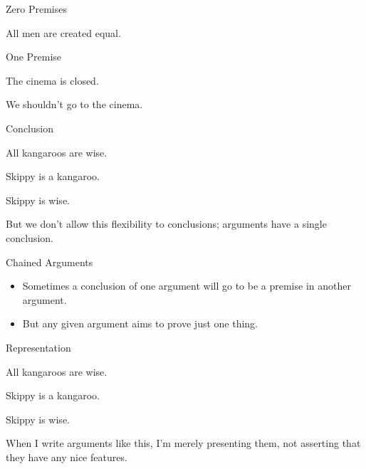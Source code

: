 \documentclass[ignorenonframetext,]{beamer}
\providecommand{\tightlist}{%
  \setlength{\itemsep}{0pt}\setlength{\parskip}{0pt}}
\renewcommand{\,}{\text{, }}
\renewenvironment*{quote}	
	{\list{}{\rightmargin   \leftmargin} \item } 	
	{\endlist }
\newcommand{\DisplayArg}[2]{
\begin{enumerate}
{#1}
\end{enumerate}
\vspace{-6pt}
\hrulefill

\begin{quote}
{\normalfont #2}
\end{quote}
\vspace{12pt}
}
\begin{document}
\begin{frame}{Zero Premises}
\protect\hypertarget{zero-premises}{}

\hrulefill \begin{quote} {\normalfont All men are created equal.} \end{quote} \vspace{12pt}

\end{frame}

\begin{frame}{One Premise}
\protect\hypertarget{one-premise}{}

\DisplayArg{ \item The cinema is closed. } { We shouldn't go to the cinema. }

\end{frame}

\begin{frame}{Conclusion}
\protect\hypertarget{conclusion-1}{}

\DisplayArg{ \item All kangaroos are wise. \item Skippy is a kangaroo. } { Skippy is wise. }

But we don't allow this flexibility to conclusions; arguments have a
single conclusion.

\end{frame}

\begin{frame}{Chained Arguments}
\protect\hypertarget{chained-arguments}{}

\begin{itemize}
\tightlist
\item
  Sometimes a conclusion of one argument will go to be a premise in
  another argument.
\item
  But any given argument aims to prove just one thing.
\end{itemize}

\end{frame}

\begin{frame}{Representation}
\protect\hypertarget{representation}{}

\DisplayArg{ \item All kangaroos are wise. \item Skippy is a kangaroo. } { Skippy is wise. }

When I write arguments like this, I'm merely presenting them, not
asserting that they have any nice features.

\end{frame}
\end{document}
